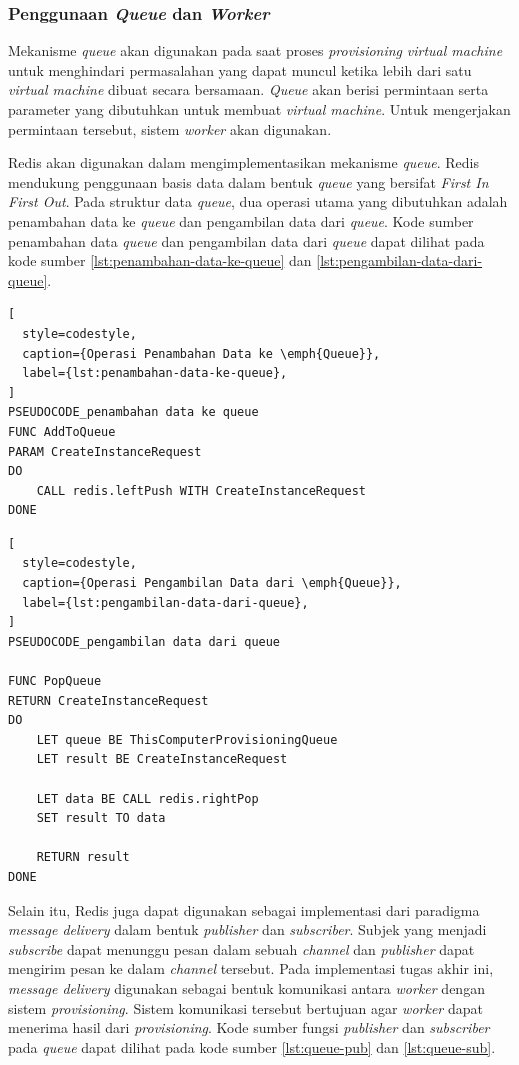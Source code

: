 \subsubsection{Penggunaan \emph{Queue} dan \emph{Worker}}
\label{sec:implementasi-queue-dan-worker}

Mekanisme \emph{queue} akan digunakan pada saat proses \emph{provisioning}
\emph{virtual machine} untuk menghindari permasalahan yang dapat muncul ketika
lebih dari satu \emph{virtual machine} dibuat secara bersamaan. \emph{Queue}
akan berisi permintaan serta parameter yang dibutuhkan untuk membuat
\emph{virtual machine}. Untuk mengerjakan permintaan tersebut, sistem \emph{worker}
akan digunakan.

Redis akan digunakan dalam mengimplementasikan mekanisme \emph{queue}. Redis mendukung
penggunaan basis data dalam bentuk \emph{queue} yang bersifat \emph{First In First Out}.
Pada struktur data \emph{queue}, dua operasi utama yang dibutuhkan adalah penambahan data
ke \emph{queue} dan pengambilan data dari \emph{queue}. Kode sumber penambahan data \emph{queue}
dan pengambilan data dari \emph{queue} dapat dilihat pada kode sumber
\ref{lst:penambahan-data-ke-queue} dan \ref{lst:pengambilan-data-dari-queue}.

\begin{lstlisting}[
  style=codestyle,
  caption={Operasi Penambahan Data ke \emph{Queue}},
  label={lst:penambahan-data-ke-queue},
]
PSEUDOCODE_penambahan data ke queue
FUNC AddToQueue
PARAM CreateInstanceRequest
DO
    CALL redis.leftPush WITH CreateInstanceRequest
DONE
\end{lstlisting}

\clearpage

\begin{lstlisting}[
  style=codestyle,
  caption={Operasi Pengambilan Data dari \emph{Queue}},
  label={lst:pengambilan-data-dari-queue},
]
PSEUDOCODE_pengambilan data dari queue

FUNC PopQueue
RETURN CreateInstanceRequest
DO
    LET queue BE ThisComputerProvisioningQueue
    LET result BE CreateInstanceRequest

    LET data BE CALL redis.rightPop
    SET result TO data

    RETURN result
DONE
\end{lstlisting}

Selain itu, Redis juga dapat digunakan sebagai implementasi dari paradigma \emph{message delivery}
dalam bentuk \emph{publisher} dan \emph{subscriber}. Subjek yang menjadi
\emph{subscribe} dapat menunggu pesan dalam sebuah \emph{channel} dan 
\emph{publisher} dapat mengirim pesan ke dalam \emph{channel} tersebut.
Pada implementasi tugas akhir ini, \emph{message delivery} digunakan
sebagai bentuk komunikasi antara \emph{worker} dengan sistem \emph{provisioning}.
Sistem komunikasi tersebut bertujuan agar \emph{worker} dapat menerima hasil
dari \emph{provisioning}. Kode sumber fungsi \emph{publisher} dan \emph{subscriber}
pada \emph{queue} dapat dilihat pada kode sumber \ref{lst:queue-pub} dan \ref{lst:queue-sub}.

